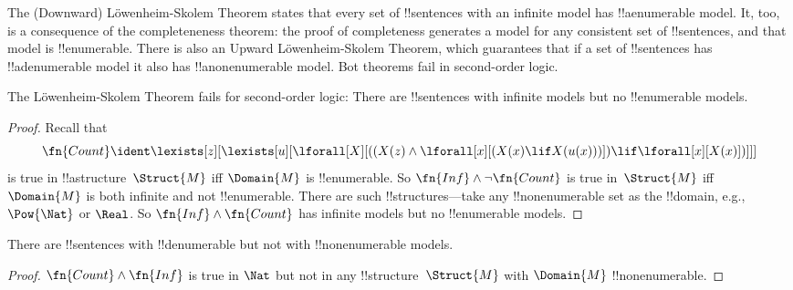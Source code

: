 \documentclass[../../../include/open-logic-section]{subfiles}
\begin{document}


\begin{explain}
The (Downward) L\"owenheim-Skolem Theorem states that every set of
!!{sentence}s with an infinite model has !!a{enumerable} model.  It,
too, is a consequence of the completeneness theorem: the proof of
completeness generates a model for any consistent set of
!!{sentence}s, and that model is !!{enumerable}.  There is also an
Upward L\"owenheim-Skolem Theorem, which guarantees that if a set of
!!{sentence}s has !!a{denumerable} model it also has
!!a{nonenumerable} model.  Bot theorems fail in second-order logic.
\end{explain}


\begin{thm}
 The L\"owenheim-Skolem Theorem fails for
second-order logic: There are !!{sentence}s with infinite models but
no !!{enumerable} models.
\end{thm}

\begin{proof}
Recall that 
\[
\fn{Count} \ident \lexists[z][\lexists[u][\lforall[X][((X(z) \land
      \lforall[x][(X(x) \lif X(u(x)))]) \lif \lforall[x][X(x)])]]]
\]
is true in !!a{structure}~$\Struct{M}$ iff $\Domain{M}$ is
!!{enumerable}. So $\fn{Inf} \land \lnot\fn{Count}$ is true in~$\Struct{M}$
iff $\Domain{M}$ is both infinite and not !!{enumerable}.  There are
such !!{structure}s---take any !!{nonenumerable} set as the
!!{domain}, e.g., $\Pow{\Nat}$ or $\Real$. So $\fn{Inf} \land
\fn{Count}$ has infinite models but no !!{enumerable} models.
\end{proof}

\begin{thm}
There are !!{sentence}s with !!{denumerable} but not with
!!{nonenumerable} models.
\end{thm}

\begin{proof}
$\fn{Count} \land \fn{Inf}$ is true in $\Nat$ but not in any
  !!{structure}~$\Struct{M}$ with $\Domain{M}$ !!{nonenumerable}.
\end{proof}
\end{document}
